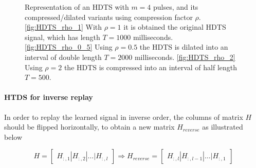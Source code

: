 \documentclass[10pt,a4paper, final]{report} %
\begin{document}
\begin{figure}[H]
\centering
{}
\caption{Representation of an HDTS with $m=4$ pulses, and its compressed/dilated variants using compression factor $\rho$. \autoref{fig:HDTS_rho_1} With $\rho = 1$ it is obtained the original HDTS signal, which has length $T=1000$ milliseconds. \autoref{fig:HDTS_rho_0_5} Using $\rho = 0.5$ the HDTS is dilated into an interval of double length $T=2000$ milliseconds. \autoref{fig:HDTS_rho_2} Using $\rho = 2$ the HDTS is compressed into an interval of half length $T=500$.}
\label{fig:HDTS_rho}
\end{figure}

\paragraph{HTDS for inverse replay}
In order to replay the learned signal in inverse order, the columns of matrix $H$ should be flipped horizontally, to obtain a new matrix $H_{reverse}$ as illustrated below

\begin{equation}
H = 
\begin{bmatrix}
 H_{:,1} | H_{:,2} | \ldots | H_{:,l}
\end{bmatrix}
\Longrightarrow
H_{reverse} = 
\begin{bmatrix}
 H_{:,l} | H_{:,l-1} | \ldots | H_{:,1}
\end{bmatrix}
\end{equation}
\end{document}
